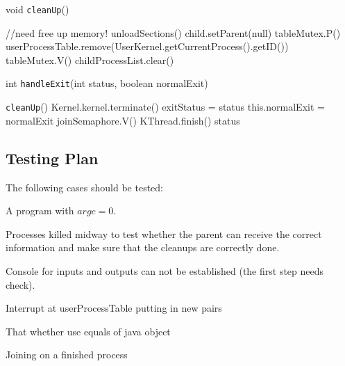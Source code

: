 \documentclass{article}
\begin{document}
\begin{spacing}{1.1}
\begin{algorithm}[htbp]
\label{alg:cleanUp}
\caption{void \texttt{cleanUp}()}
  \begin{algorithmic}
    \ENDIF
    \ENDFOR
    \STATE \colorbox{myyellow}{//need free up memory!}
    \STATE unloadSections()
      \STATE child.setParent(null)
    \ENDIF
    \ENDFOR
    \STATE \colorbox{myyellow}{tableMutex.P()}
    \STATE userProcessTable.remove(UserKernel.getCurrentProcess().getID())
    \STATE \colorbox{myyellow}{tableMutex.V()}
    \STATE childProcessList.clear()
  \end{algorithmic}
\end{algorithm}

\begin{algorithm}[htbp]
\label{alg:handleExit}
\caption{int \texttt{handleExit}(int status, boolean normalExit)}
  \begin{algorithmic}
    \STATE \texttt{cleanUp}()
      \STATE Kernel.kernel.terminate()
    \ENDIF
    \STATE exitStatus = status
    \STATE this.normalExit = normalExit
    \STATE joinSemaphore.V()
    \STATE \colorbox{myyellow}{KThread.finish()}
    \RETURN status
  \end{algorithmic}
\end{algorithm}

\subsection{Testing Plan}
The following cases should be tested:
\begin{asparaitem}
  \item A program with $argc=0$.
  \item Processes killed midway to test whether the parent can receive the correct information and make sure that the cleanups are correctly done.
  \item Console for inputs and outputs can not be established (the first step needs check).
  \item Interrupt at userProcessTable putting in new pairs
  \item That whether use equals of java object
  \item Joining on a finished process
\end{asparaitem}



\end{spacing}
\end{document}

